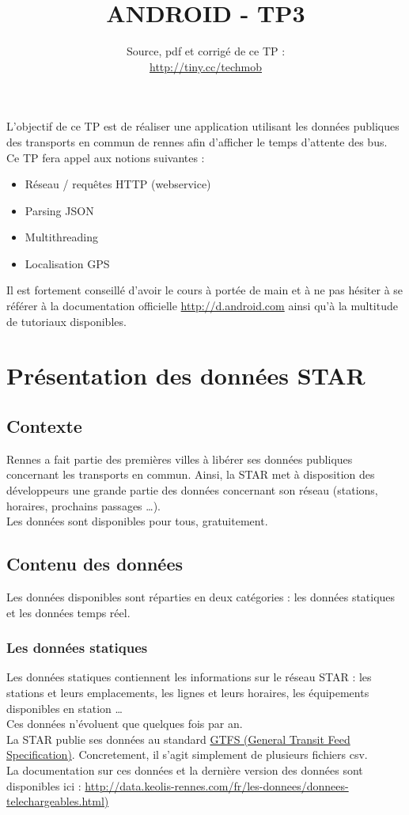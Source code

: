 \documentclass{article}
\title{ANDROID - TP3}
\date{Source, pdf et corrigé de ce TP
:\\\href{http://tiny.cc/techmob}{http://tiny.cc/techmob}}
\begin{document}
\maketitle
L'objectif de ce TP est de réaliser une application utilisant les données
publiques des transports en commun de rennes afin d'afficher le temps
d'attente des bus.\\
Ce TP fera appel aux notions suivantes :
\begin{itemize}
  \item Réseau / requêtes HTTP (webservice)
  \item Parsing JSON
  \item Multithreading
  \item Localisation GPS
\end{itemize}
Il est fortement conseillé d'avoir le cours à portée de main et à ne pas hésiter
à se référer à la documentation officielle
\href{http://d.android.com}{http://d.android.com} ainsi qu'à la multitude de
tutoriaux disponibles.
\section{Présentation des données STAR}
\subsection{Contexte}
Rennes a fait partie des premières villes à libérer ses données publiques
concernant les transports en commun. Ainsi, la STAR met à disposition des
développeurs une grande partie des données concernant son réseau (stations,
horaires, prochains passages \ldots).\\
Les données sont disponibles pour tous, gratuitement.
\subsection{Contenu des données}
Les données disponibles sont réparties en deux catégories : les données
statiques et les données temps réel.
\subsubsection{Les données statiques}
Les données statiques contiennent les informations sur le réseau STAR : les
stations et leurs emplacements, les lignes et leurs horaires, les équipements
disponibles en station \ldots\\
Ces données n'évoluent que quelques fois par an.\\
La STAR publie ses données au standard \href{https://developers.google.com/transit/gtfs/reference}{GTFS (General
Transit Feed Specification)}. Concretement, il s'agit simplement de plusieurs
fichiers csv.\\
La documentation sur ces données et la dernière version des données sont
disponibles ici :
\href{http://data.keolis-rennes.com/fr/les-donnees/donnees-telechargeables.html}{http://data.keolis-rennes.com/fr/les-donnees/donnees-telechargeables.html)}
\end{document}
